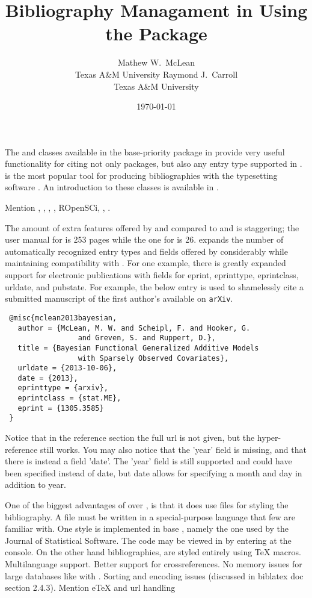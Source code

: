 \documentclass[article]{jss}\usepackage[]{graphicx}\usepackage[]{color}
\title{\Biblatex{} Bibliography Managament in \R{} Using the \ourpkg{} Package}
\author{Mathew W.\ McLean\\ Texas A\&M University
\And
Raymond J.\ Carroll\\
Texas A\&M University
}
\date{\today}
\begin{document}
\maketitle

The  and  classes available in the base-priority  package in \R{} provide very useful functionality for citing not only \R{} packages, but also any entry type supported in \Bibtex.  \Bibtex{} \citep{bibtex} is the most popular tool for producing bibliographies with the typesetting software \proglang{\TeX}.  An introduction to these classes is available in \citet{hornik2012who}.

Mention , , , , ROpenSCi, , .

The amount of extra features offered by \Biblatex{} and \biber{} compared to \natbib{} and \Bibtex{} is staggering; the user manual for \Biblatex{} is 253 pages while the one for \natbib{} is 26.  \Biblatex{} expands the number of automatically recognized entry types and fields offered by \Bibtex{} considerably while maintaining compatibility with \Bibtex{}.  For one example, there is greatly expanded support for electronic publications with fields for eprint, eprinttype, eprintclass, urldate, and pubstate.  For example, the below entry is used to shamelessly cite a submitted manuscript of the first author's available on \texttt{arXiv}. 




 \begin{verbatim}
 @misc{mclean2013bayesian,
   author = {McLean, M. W. and Scheipl, F. and Hooker, G.
                 and Greven, S. and Ruppert, D.},
   title = {Bayesian Functional Generalized Additive Models 
                 with Sparsely Observed Covariates},
   urldate = {2013-10-06},
   date = {2013},
   eprinttype = {arxiv},
   eprintclass = {stat.ME},
   eprint = {1305.3585}
 }
 \end{verbatim}

Notice that in the reference section the full url is not given, but the hyper-reference still works.  You may also notice that the 'year' field is missing, and that there is instead a field 'date'.  The 'year' field is still supported and could have been specified instead of date, but date allows for specifying a month and day in addition to year.

One of the biggest advantages of \Biblatex{} over \Bibtex{}, is that it does use \bst{} files for styling the bibliography. A \bst{} file must be written in a special-purpose language that few are familiar with.  One style is implemented in base , namely the one used by the Journal of Statistical Software.  The code may be viewed in  by entering  at the console.  On the other hand \Biblatex{} bibliographies, are styled entirely using \TeX{} macros.  Multilanguage support.  Better support for crossreferences.  No memory issues for large databases like with \Bibtex{}.  Sorting and encoding issues (discussed in biblatex doc section 2.4.3). Mention eTeX and url handling
\end{document}
